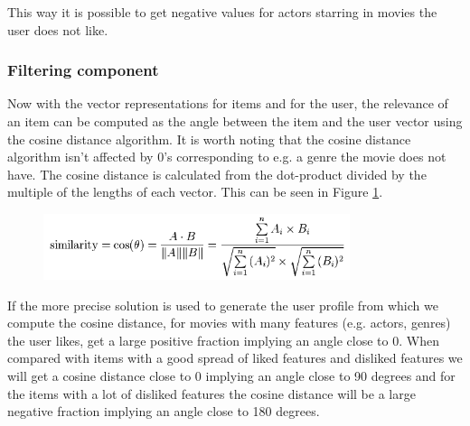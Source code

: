 This way it is possible to get negative values for actors starring in movies the user does not like.

 
\subsubsection{Filtering component}

Now with the vector representations for items and for the user, the relevance of an item can be computed as the angle between the item and the user vector using the cosine distance algorithm. It is worth noting that the cosine distance algorithm isn't affected by 0's corresponding to e.g. a genre the movie does not have. The cosine distance is calculated from the dot-product divided by the multiple of the lengths of each vector. This can be seen in Figure \ref{Cosine}.

\begin{figure}[H]
\centering
\includegraphics[width=0.8\textwidth]{Images/Cosinesimularity.png}
\caption{}
\label{Cosine}
\end{figure}

If the more precise solution is used to generate the user profile from which we compute the cosine distance, for movies with many features (e.g. actors, genres) the user likes, get a large positive fraction implying an angle close to 0. When compared with items with a good spread of liked features and disliked features we will get a cosine distance close to 0 implying an angle close to 90 degrees and for the items with a lot of disliked features the cosine distance will be a large negative fraction implying an angle close to 180 degrees.